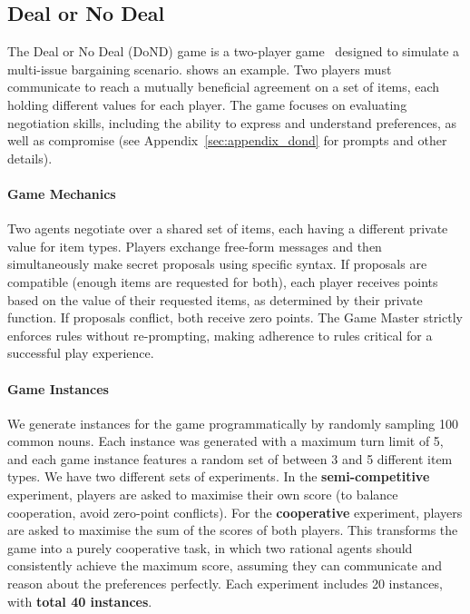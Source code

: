 \documentclass[11pt]{article}
\begin{document}
\subsection{Deal or No Deal}

The Deal or No Deal (DoND) game is a two-player game~\cite{lewis-etal-2017-deal} designed to simulate a multi-issue bargaining scenario.  shows an example. Two players must communicate to reach a mutually beneficial agreement on a set of items, each holding different values for each player. The game focuses on evaluating negotiation skills, including the ability to express and understand preferences, as well as compromise (see Appendix~\ref{sec:appendix_dond} for prompts and other details).



\paragraph{Game Mechanics}
Two agents negotiate over a shared set of items, each having a different private value for item types. Players exchange free-form messages and then simultaneously make secret proposals using specific syntax. If proposals are compatible (enough items are requested for both), each player receives points based on the value of their requested items, as determined by their private function. If proposals conflict, both receive zero points. The Game Master strictly enforces rules without re-prompting, making adherence to rules critical for a successful play experience.


\paragraph{Game Instances}
We generate instances for the game programmatically by randomly sampling 100 common nouns. Each instance was generated with a maximum turn limit of 5, and each game instance features a random set of between 3 and 5 different item types. We have two different sets of experiments. In the \textbf{semi-competitive} experiment, players are asked to maximise their own score (to balance cooperation, avoid zero-point conflicts). For the \textbf{cooperative} experiment, players are asked to maximise the sum of the scores of both players. This transforms the game into a purely cooperative task, in which two rational agents should consistently achieve the maximum score, assuming they can communicate and reason about the preferences perfectly. Each experiment includes 20 instances, with \textbf{total 40 instances}.
\end{document}
